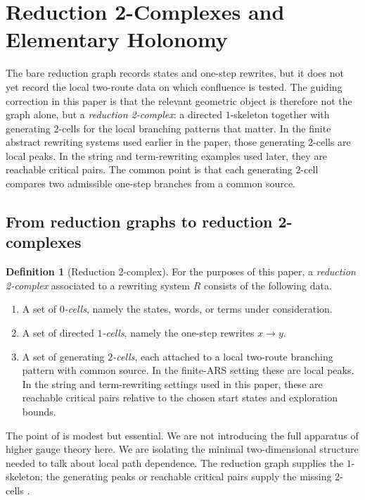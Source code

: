 \documentclass[11pt]{article}
\numberwithin{equation}{section}
\theoremstyle{definition}
\newtheorem{definition}[theorem]{Definition}
\theoremstyle{remark}
\begin{document}
 \section{Reduction 2-Complexes and Elementary Holonomy}
\label{sec:reduction-two-complex}

The bare reduction graph records states and one-step rewrites, but it does not yet record the local two-route data on which confluence is tested. The guiding correction in this paper is that the relevant geometric object is therefore not the graph alone, but a \emph{reduction 2-complex}: a directed $1$-skeleton together with generating $2$-cells for the local branching patterns that matter. In the finite abstract rewriting systems used earlier in the paper, those generating $2$-cells are local peaks. In the string and term-rewriting examples used later, they are reachable critical pairs. The common point is that each generating $2$-cell compares two admissible one-step branches from a common source.

\subsection{From reduction graphs to reduction 2-complexes}

\begin{definition}[Reduction 2-complex]
\label{def:reduction-two-complex}
For the purposes of this paper, a \emph{reduction 2-complex} associated to a rewriting system $R$ consists of the following data.
\begin{enumerate}
    \item A set of \emph{$0$-cells}, namely the states, words, or terms under consideration.
    \item A set of directed \emph{$1$-cells}, namely the one-step rewrites $x \to y$.
    \item A set of generating \emph{$2$-cells}, each attached to a local two-route branching pattern with common source. In the finite-ARS setting these are local peaks. In the string and term-rewriting settings used in this paper, these are reachable critical pairs relative to the chosen start states and exploration bounds.
\end{enumerate}
\end{definition}

The point of  is modest but essential. We are not introducing the full apparatus of higher gauge theory here. We are isolating the minimal two-dimensional structure needed to talk about local path dependence. The reduction graph supplies the $1$-skeleton; the generating peaks or reachable critical pairs supply the missing $2$-cells \cite{Mimram2023,GuiraudMalbos2018,GuiraudMalbos2012,Squier1987}.
\end{document}
